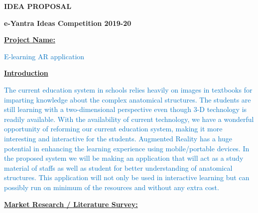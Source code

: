 \documentclass[12pt]{article}
\begin{document}
\begin{Center}
{\fontsize{18pt}{21.6pt}\selectfont \textbf{IDEA PROPOSAL}\par}
\end{Center}\par

\setlength{\parskip}{8.04pt}
\begin{Center}
{\fontsize{18pt}{21.6pt}\selectfont \textbf{e-Yantra Ideas Competition 2019-20}\par}
\end{Center}\par


\vspace{\baselineskip}
{\fontsize{14pt}{16.8pt}\selectfont \textbf{\uline{Project Name:}}\par}\tab \par

\textcolor[HTML]{0070C0}{E-learning AR application}\par

{\fontsize{14pt}{16.8pt}\selectfont \textbf{\uline{ Introduction}}\par}\par

\textcolor[HTML]{0070C0}{The current education system in schools relies heavily on images in textbooks for imparting knowledge about the complex anatomical structures. The students are still learning with a two-dimensional perspective even though 3-D technology is readily available. With the availability of current technology, we have a wonderful opportunity of reforming our current education system, making it more interesting and interactive for the students. Augmented Reality has a huge potential in enhancing the learning experience using mobile/portable devices. In the proposed system we will be making an application that will act as a study material of staffs as well as student for better understanding of anatomical structures. This application will not only be used in interactive learning but can possibly run on minimum of the resources and without any extra cost.}\par

{\fontsize{14pt}{16.8pt}\selectfont \textbf{\uline{Market Research / Literature Survey:}}\par}\par
\end{document}
